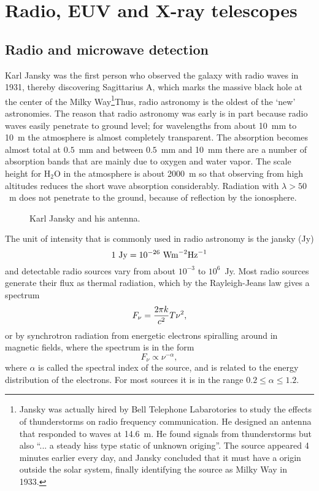 \documentclass{article}
\begin{document}
\setcounter{section}{7}
\section{Radio, EUV and X-ray telescopes}

\subsection{Radio and microwave detection}

Karl Jansky was the first person who observed the galaxy with radio waves in 
1931, thereby discovering Sagittarius A, which marks the massive black hole 
at the center of the Milky Way\footnote{Jansky was actually hired by
  Bell Telephone Labarotories to study the effects of thunderstorms on
  radio frequency communication. He designed an antenna that responded
  to waves at 14.6~m. He found signals from thunderstorms but also
  ``... a steady hiss type static of unknown origing''. The source
  appeared 4 minutes earlier every day, and Jansky concluded that it
  must have a origin outside the solar system, finally identifying the
  source as Milky Way in 1933.}Thus, radio astronomy is the 
oldest of the `new' astronomies. The reason
that radio astronomy was early is in part because radio waves easily penetrate
to ground level; for wavelengths from about 10~mm to 10~m the atmosphere is
almost completely transparent. The absorption becomes almost total at 
$0.5$~mm and between $0.5$~mm and 10~mm there are a number of absorption bands
that are mainly due to oxygen and water vapor. The scale height for H$_2$O 
in the atmosphere is about 2000~m so that observing from high altitudes 
reduces the short wave absorption considerably. Radiation with $\lambda>50$~m
does not penetrate to the ground, because of reflection by the ionosphere.

\begin{figure}[h]
  \centering  {}
  \caption{Karl Jansky and his antenna.}
  \label{fig:jansky-antenna}
\end{figure}

The unit of intensity that is commonly used in radio astronomy is the 
jansky (Jy)
\[
1~{\rm Jy}=10^{-26}~{\rm W m}^{-2}{\rm Hz}^{-1}
\]
and detectable radio sources vary from about $10^{-3}$ to $10^6$~Jy. Most
radio sources generate their flux as thermal radiation, which by the 
Rayleigh-Jeans law gives a spectrum
\[
F_\nu={2\pi k\over c^2}T\nu^2,
\]
or by synchrotron radiation from energetic electrons spiralling around
in magnetic fields, where the spectrum is in the form
\[
F_\nu\propto\nu^{-\alpha},
\]
where $\alpha$ is called the spectral index of the source, and is related
to the energy distribution of the electrons. For most sources it is in the
range $0.2\le \alpha\le 1.2$.
\end{document}
